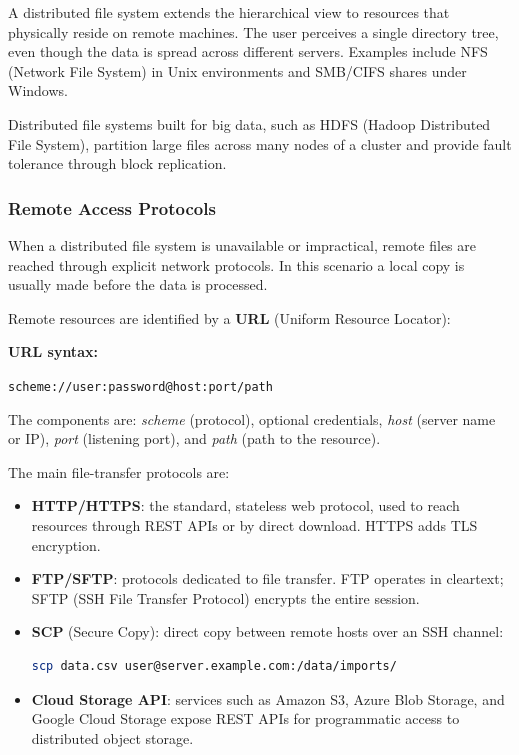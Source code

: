 A distributed file system extends the hierarchical view to resources that physically reside on remote machines. The user perceives a single directory tree, even though the data is spread across different servers. Examples include NFS (Network File System) in Unix environments and SMB/CIFS shares under Windows.

Distributed file systems built for big data, such as HDFS (Hadoop Distributed File System), partition large files across many nodes of a cluster and provide fault tolerance through block replication.

\subsubsection{Remote Access Protocols}
\label{subsec:network-protocols}

When a distributed file system is unavailable or impractical, remote files are reached through explicit network protocols. In this scenario a local copy is usually made before the data is processed.

Remote resources are identified by a \textbf{URL} (Uniform Resource Locator):

\begin{notebox}
\textbf{URL syntax:}

\texttt{scheme://user:password@host:port/path}

The components are: \textit{scheme} (protocol), optional credentials, \textit{host} (server name or IP), \textit{port} (listening port), and \textit{path} (path to the resource).
\end{notebox}

The main file-transfer protocols are:

\begin{itemize}
    \item \textbf{HTTP/HTTPS}: the standard, stateless web protocol, used to reach resources through REST APIs or by direct download. HTTPS adds TLS encryption.
    \item \textbf{FTP/SFTP}: protocols dedicated to file transfer. FTP operates in cleartext; SFTP (SSH File Transfer Protocol) encrypts the entire session.
    \item \textbf{SCP} (Secure Copy): direct copy between remote hosts over an SSH channel:
\begin{lstlisting}[language=bash, basicstyle=\ttfamily\scriptsize]
scp data.csv user@server.example.com:/data/imports/
\end{lstlisting}
    \item \textbf{Cloud Storage API}: services such as Amazon S3, Azure Blob Storage, and Google Cloud Storage expose REST APIs for programmatic access to distributed object storage.
\end{itemize}

